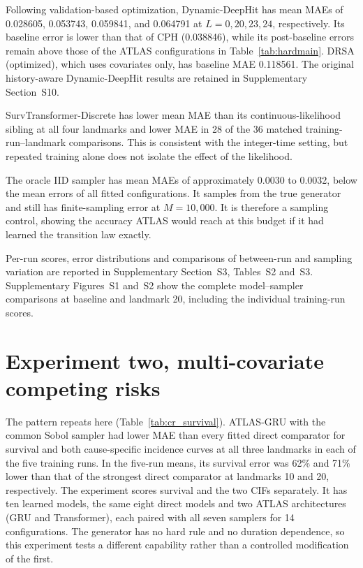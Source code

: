 Following validation-based optimization, Dynamic-DeepHit has mean MAEs of 0.028605, 0.053743, 0.059841, and 0.064791 at $L=0,20,23,24$, respectively. Its baseline error is lower than that of CPH (0.038846), while its post-baseline errors remain above those of the ATLAS configurations in Table~\ref{tab:hardmain}. DRSA (optimized), which uses covariates only, has baseline MAE 0.118561. The original history-aware Dynamic-DeepHit results are retained in Supplementary Section~S10.

SurvTransformer-Discrete has lower mean MAE than its continuous-likelihood sibling at all four landmarks and lower MAE in 28 of the 36 matched training-run--landmark comparisons. This is consistent with the integer-time setting, but repeated training alone does not isolate the effect of the likelihood.

The oracle IID sampler has mean MAEs of approximately 0.0030 to 0.0032, below the mean errors of all fitted configurations. It samples from the true generator and still has finite-sampling error at $M=10{,}000$. It is therefore a sampling control, showing the accuracy ATLAS would reach at this budget if it had learned the transition law exactly.

Per-run scores, error distributions and comparisons of between-run and sampling variation are reported in Supplementary Section~S3, Tables~S2 and~S3. Supplementary Figures~S1 and~S2 show the complete model--sampler comparisons at baseline and landmark 20, including the individual training-run scores.

\section{Experiment two, multi-covariate competing risks}\label{sec:crresults}
The pattern repeats here (Table~\ref{tab:cr_survival}). ATLAS-GRU with the common Sobol sampler had lower MAE than every fitted direct comparator for survival and both cause-specific incidence curves at all three landmarks in each of the five training runs. In the five-run means, its survival error was 62\% and 71\% lower than that of the strongest direct comparator at landmarks 10 and 20, respectively. The experiment scores survival and the two CIFs separately. It has ten learned models, the same eight direct models and two ATLAS architectures (GRU and Transformer), each paired with all seven samplers for 14 configurations. The generator has no hard rule and no duration dependence, so this experiment tests a different capability rather than a controlled modification of the first.

